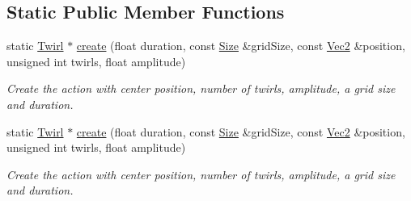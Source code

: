 \subsection*{Static Public Member Functions}
\begin{DoxyCompactItemize}
\item 
static \hyperlink{classTwirl}{Twirl} $\ast$ \hyperlink{classTwirl_a3d7846d173ada9cb11329e08d4178454}{create} (float duration, const \hyperlink{classSize}{Size} \&grid\+Size, const \hyperlink{classVec2}{Vec2} \&position, unsigned int twirls, float amplitude)
\begin{DoxyCompactList}\small\item\em Create the action with center position, number of twirls, amplitude, a grid size and duration. \end{DoxyCompactList}\item 
static \hyperlink{classTwirl}{Twirl} $\ast$ \hyperlink{classTwirl_ab568e261a18b8c942d8243854a9f45e6}{create} (float duration, const \hyperlink{classSize}{Size} \&grid\+Size, const \hyperlink{classVec2}{Vec2} \&position, unsigned int twirls, float amplitude)
\begin{DoxyCompactList}\small\item\em Create the action with center position, number of twirls, amplitude, a grid size and duration. \end{DoxyCompactList}\end{DoxyCompactItemize}
